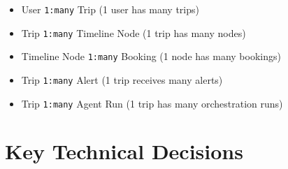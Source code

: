 \documentclass[11pt]{article}
\begin{document}
\begin{itemize}
    \item User \texttt{1:many} Trip (1 user has many trips)
    \item Trip \texttt{1:many} Timeline Node (1 trip has many nodes)
    \item Timeline Node \texttt{1:many} Booking (1 node has many bookings)
    \item Trip \texttt{1:many} Alert (1 trip receives many alerts)
    \item Trip \texttt{1:many} Agent Run (1 trip has many orchestration runs)
\end{itemize}

\section{Key Technical Decisions}
\end{document}
